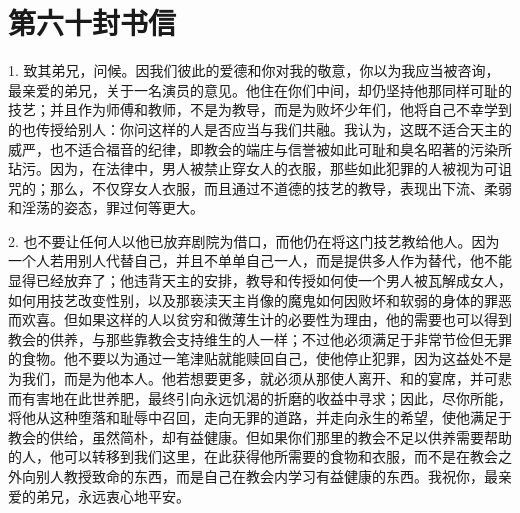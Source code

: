 

\section{第六十封书信}

\par

1. 致其弟兄，问候。因我们彼此的爱德和你对我的敬意，你以为我应当被咨询，最亲爱的弟兄，关于一名演员的意见。他住在你们中间，却仍坚持他那同样可耻的技艺；并且作为师傅和教师，不是为教导，而是为败坏少年们，他将自己不幸学到的也传授给别人：你问这样的人是否应当与我们共融。我认为，这既不适合天主的威严，也不适合福音的纪律，即教会的端庄与信誉被如此可耻和臭名昭著的污染所玷污。因为，在法律中，男人被禁止穿女人的衣服，那些如此犯罪的人被视为可诅咒的；那么，不仅穿女人衣服，而且通过不道德的技艺的教导，表现出下流、柔弱和淫荡的姿态，罪过何等更大。\par

2. 也不要让任何人以他已放弃剧院为借口，而他仍在将这门技艺教给他人。因为一个人若用别人代替自己，并且不单单自己一人，而是提供多人作为替代，他不能显得已经放弃了；他违背天主的安排，教导和传授如何使一个男人被瓦解成女人，如何用技艺改变性别，以及那亵渎天主肖像的魔鬼如何因败坏和软弱的身体的罪恶而欢喜。但如果这样的人以贫穷和微薄生计的必要性为理由，他的需要也可以得到教会的供养，与那些靠教会支持维生的人一样；不过他必须满足于非常节俭但无罪的食物。他不要以为通过一笔津贴就能赎回自己，使他停止犯罪，因为这益处不是为我们，而是为他本人。他若想要更多，就必须从那使人离开、和的宴席，并可悲而有害地在此世养肥，最终引向永远饥渴的折磨的收益中寻求；因此，尽你所能，将他从这种堕落和耻辱中召回，走向无罪的道路，并走向永生的希望，使他满足于教会的供给，虽然简朴，却有益健康。但如果你们那里的教会不足以供养需要帮助的人，他可以转移到我们这里，在此获得他所需要的食物和衣服，而不是在教会之外向别人教授致命的东西，而是自己在教会内学习有益健康的东西。我祝你，最亲爱的弟兄，永远衷心地平安。\par

